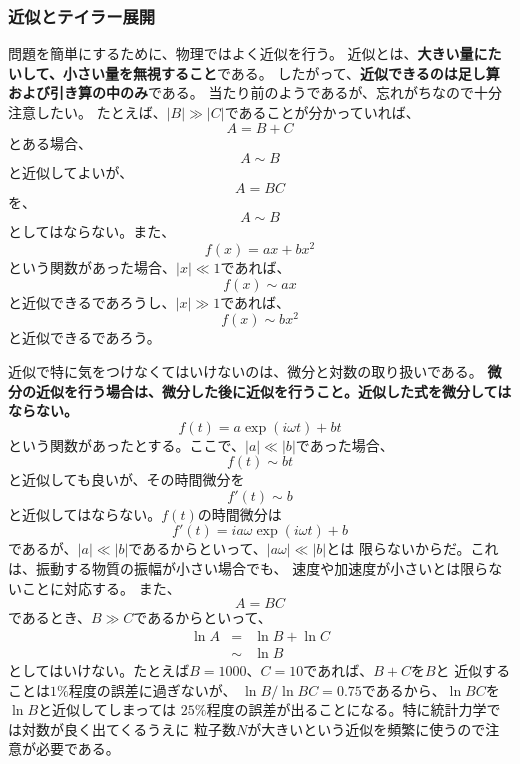\documentclass{jarticle}
\begin{document}
\subsubsection{近似とテイラー展開}

問題を簡単にするために、物理ではよく近似を行う。
近似とは、{\bf 大きい量にたいして、小さい量を無視すること}である。
したがって、{\bf 近似できるのは足し算および引き算の中のみ}である。
当たり前のようであるが、忘れがちなので十分注意したい。
たとえば、$|B|\gg |C|$であることが分かっていれば、
\begin{equation}
  A = B + C
\end{equation}
とある場合、
\begin{equation}
  A \sim B
\end{equation}
と近似してよいが、
\begin{equation}
  A = BC
\end{equation}
を、
\begin{equation}
  A \sim B
\end{equation}
としてはならない。また、
\begin{equation}
  f(x) = a x + b x^2
\end{equation}
という関数があった場合、$|x| \ll 1 $であれば、
\begin{equation}
  f(x) \sim a x
\end{equation}
と近似できるであろうし、$|x| \gg 1 $であれば、
\begin{equation}
  f(x) \sim b x^2
\end{equation}
と近似できるであろう。

近似で特に気をつけなくてはいけないのは、微分と対数の取り扱いである。
{\bf 微分の近似を行う場合は、微分した後に近似を行うこと。近似した式を微分してはならない。}
\begin{equation}
  f(t) = a \exp(i \omega t) + b t
\end{equation}
という関数があったとする。ここで、$|a| \ll |b|$であった場合、
\begin{equation}
  f(t) \sim  b t
\end{equation}
と近似しても良いが、その時間微分を
\begin{equation}
  f'(t) \sim  b
\end{equation}
と近似してはならない。$f(t)$の時間微分は
\begin{equation}
  f'(t) =  i a \omega \exp(i \omega t) + b
\end{equation}
であるが、$|a| \ll |b|$であるからといって、$|a\omega| \ll |b|$とは
限らないからだ。これは、振動する物質の振幅が小さい場合でも、
速度や加速度が小さいとは限らないことに対応する。
また、
\begin{equation}
  A = BC
\end{equation}
であるとき、$B\gg C$であるからといって、
\begin{eqnarray}
  \ln A &=& \ln B + \ln C \\
  &\sim & \ln B
\end{eqnarray}
としてはいけない。たとえば$B=1000$、$C = 10$であれば、$B+C$を$B$と
近似することは$1\%$程度の誤差に過ぎないが、
$\ln B/ \ln BC = 0.75$であるから、$\ln BC $を$\ln B$と近似してしまっては
$25\%$程度の誤差が出ることになる。特に統計力学では対数が良く出てくるうえに
粒子数$N$が大きいという近似を頻繁に使うので注意が必要である。
\end{document}
